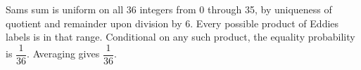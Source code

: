 Sam\textquotesingle s sum is uniform on all 36 integers from 0 through 35, by uniqueness of quotient and remainder upon division by 6. Every possible product of Eddie\textquotesingle s labels is in that range. Conditional on any such product, the equality probability is $\dfrac{1}{36}$. Averaging gives $\boxed{\dfrac{1}{36}}$.
